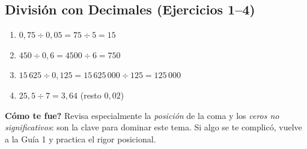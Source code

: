 \documentclass[12pt, letterpaper]{article}
\begin{document}
  \subsection*{División con Decimales (Ejercicios 1--4)}

  \begin{enumerate}[leftmargin=*, label=\textbf{\arabic*.}]
    \item $0{,}75 \div 0{,}05 = 75 \div 5 = 15$
    \item $450 \div 0{,}6 = 4500 \div 6 = 750$
    \item $15\,625 \div 0{,}125 = 15\,625\,000 \div 125 = 125\,000$
    \item $25{,}5 \div 7 = 3{,}64$ \quad (resto $0{,}02$)
  \end{enumerate}

  \vspace{10pt}
  \begin{cuadrosolucion}
    \textbf{\textquestiondown Cómo te fue?} Revisa especialmente la \emph{posición} de la coma y los \emph{ceros no significativos}: son la clave para dominar este tema. Si algo se te complicó, vuelve a la Guía 1 y practica el rigor posicional.
  \end{cuadrosolucion}

\fi
\end{document}
